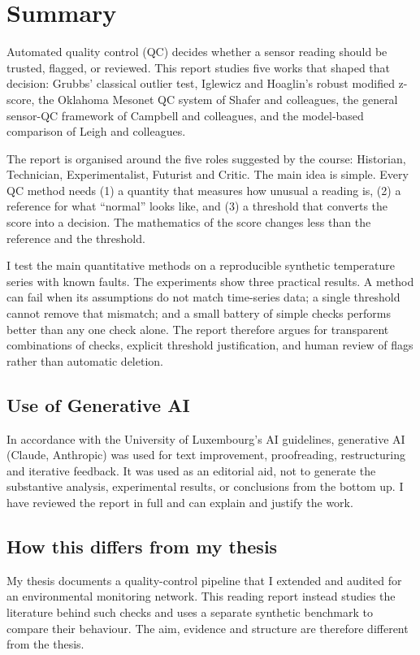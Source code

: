 \documentclass[12pt,a4paper]{article}
\begin{document}
\thispagestyle{empty}
\section*{Summary}

Automated quality control (QC) decides whether a sensor reading should be
trusted, flagged, or reviewed. This report studies five works that shaped
that decision: Grubbs' classical outlier test, Iglewicz and Hoaglin's robust
modified z-score, the Oklahoma Mesonet QC system of Shafer and colleagues,
the general sensor-QC framework of Campbell and colleagues, and the
model-based comparison of Leigh and colleagues.

The report is organised around the five roles suggested by the course:
Historian, Technician, Experimentalist, Futurist and Critic. The main idea is
simple. Every QC method needs (1) a quantity that measures how unusual a
reading is, (2) a reference for what ``normal'' looks like, and (3) a
threshold that converts the score into a decision. The mathematics of the
score changes less than the reference and the threshold.

I test the main quantitative methods on a reproducible synthetic temperature
series with known faults. The experiments show three practical results. A
method can fail when its assumptions do not match time-series data; a single
threshold cannot remove that mismatch; and a small battery of simple checks
performs better than any one check alone. The report therefore argues for
transparent combinations of checks, explicit threshold justification, and
human review of flags rather than automatic deletion.

\subsection*{Use of Generative AI}
In accordance with the University of Luxembourg's AI guidelines, generative
AI (Claude, Anthropic) was used for text improvement, proofreading,
restructuring and iterative feedback. It was used as an editorial aid, not
to generate the substantive analysis, experimental results, or conclusions
from the bottom up. I have reviewed the report in full and can explain and
justify the work.

\subsection*{How this differs from my thesis}
My thesis documents a quality-control pipeline that I extended and audited
for an environmental monitoring network. This reading report instead studies
the literature behind such checks and uses a separate synthetic benchmark to
compare their behaviour. The aim, evidence and structure are therefore
different from the thesis.
\end{document}
